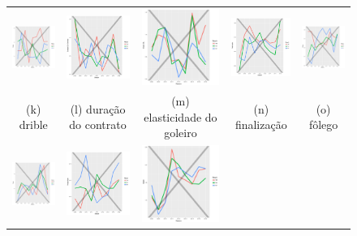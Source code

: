 \documentclass[review]{elsarticle}
\begin{document}
\begin{figure}
\begin{tabular}{ccccc}
 \includegraphics[width=25mm]{dribles_result_trans} & \includegraphics[width=25mm]{duracaodocontrato_result_trans} &   \includegraphics[width=25mm]{elast_gl_result_trans} &
  \includegraphics[width=25mm]{finalizacao_result_trans} & \includegraphics[width=25mm]{folego_result_trans}  \\
 \scriptsize{(k) drible} & \scriptsize{(l) duração do contrato } & \scriptsize{(m) elasticidade do goleiro} & \scriptsize{(n) finalização} & \scriptsize{(o) fôlego}\\[3pt]
  \includegraphics[width=25mm]{forca_result_trans} & \includegraphics[width=25mm]{forcachute_result_trans}  &   \includegraphics[width=25mm]{idade_result_trans} &

\end{tabular}
\end{figure}
\end{document}
